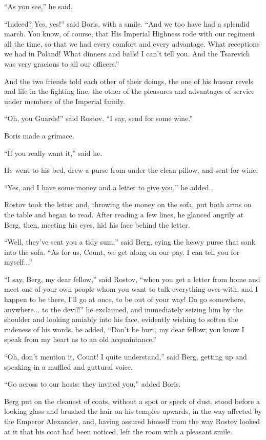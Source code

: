 ``As you see,'' he said.

``Indeed? Yes, yes!'' said Boris, with a smile. ``And we too have
had a splendid march. You know, of course, that His Imperial
Highness rode with our regiment all the time, so that we had
every comfort and every advantage. What receptions we had in
Poland! What dinners and balls! I can't tell you. And the
Tsarevich was very gracious to all our officers.''

And the two friends told each other of their doings, the one of
his hussar revels and life in the fighting line, the other of the
pleasures and advantages of service under members of the Imperial
family.

``Oh, you Guards!'' said Rostov. ``I say, send for some wine.''

Boris made a grimace.

``If you really want it,'' said he.

He went to his bed, drew a purse from under the clean pillow, and
sent for wine.

``Yes, and I have some money and a letter to give you,'' he
added.

Rostov took the letter and, throwing the money on the sofa, put
both arms on the table and began to read. After reading a few
lines, he glanced angrily at Berg, then, meeting his eyes, hid
his face behind the letter.

``Well, they've sent you a tidy sum,'' said Berg, eying the heavy
purse that sank into the sofa. ``As for us, Count, we get along
on our pay. I can tell you for myself...''

``I say, Berg, my dear fellow,'' said Rostov, ``when you get a
letter from home and meet one of your own people whom you want to
talk everything over with, and I happen to be there, I'll go at
once, to be out of your way! Do go somewhere, anywhere... to the
devil!'' he exclaimed, and immediately seizing him by the
shoulder and looking amiably into his face, evidently wishing to
soften the rudeness of his words, he added, ``Don't be hurt, my
dear fellow; you know I speak from my heart as to an old
acquaintance.''

``Oh, don't mention it, Count! I quite understand,'' said Berg,
getting up and speaking in a muffled and guttural voice.

``Go across to our hosts: they invited you,'' added Boris.

Berg put on the cleanest of coats, without a spot or speck of
dust, stood before a looking glass and brushed the hair on his
temples upwards, in the way affected by the Emperor Alexander,
and, having assured himself from the way Rostov looked at it that
his coat had been noticed, left the room with a pleasant smile.


